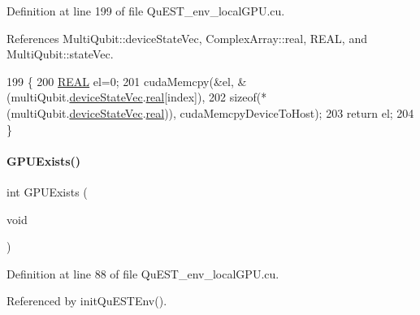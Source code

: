 Definition at line 199 of file Qu\+E\+S\+T\+\_\+env\+\_\+local\+G\+P\+U.\+cu.



References Multi\+Qubit\+::device\+State\+Vec, Complex\+Array\+::real, R\+E\+AL, and Multi\+Qubit\+::state\+Vec.


\begin{DoxyCode}
199                                                              \{
200     \mbox{\hyperlink{QuEST__precision_8h_a4b654506f18b8bfd61ad2a29a7e38c25}{REAL}} el=0;
201     cudaMemcpy(&el, &(multiQubit.\mbox{\hyperlink{structMultiQubit_a59ac613486a41b8c9a4b6e79cc8d2cc3}{deviceStateVec}}.\mbox{\hyperlink{structComplexArray_a4195cac6c784ea1b6271f1c7dba1548a}{real}}[index]), 
202             \textcolor{keyword}{sizeof}(*(multiQubit.\mbox{\hyperlink{structMultiQubit_a59ac613486a41b8c9a4b6e79cc8d2cc3}{deviceStateVec}}.\mbox{\hyperlink{structComplexArray_a4195cac6c784ea1b6271f1c7dba1548a}{real}})), cudaMemcpyDeviceToHost);
203     \textcolor{keywordflow}{return} el;
204 \}
\end{DoxyCode}
\mbox{\label{QuEST__env__localGPU_8cu_a0aabd5ed69a74e5bc0b46a17af45c886}} 
\paragraph{\texorpdfstring{G\+P\+U\+Exists()}{GPUExists()}}
{\footnotesize\ttfamily int G\+P\+U\+Exists (\begin{DoxyParamCaption}\item[{void}]{ }\end{DoxyParamCaption})}



Definition at line 88 of file Qu\+E\+S\+T\+\_\+env\+\_\+local\+G\+P\+U.\+cu.



Referenced by init\+Qu\+E\+S\+T\+Env().



